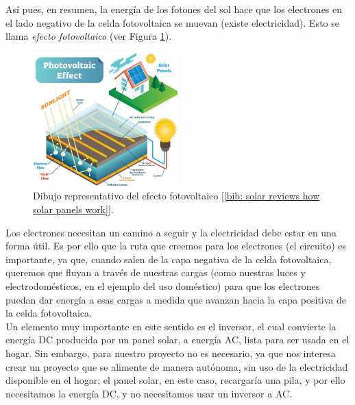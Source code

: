 \documentclass[12pt]{article}
\begin{document}
	\noindent Así pues, en resumen, la energía de los fotones del sol hace que los electrones en el lado negativo de la celda fotovoltaica se muevan (existe electricidad). Esto se llama \textit{efecto fotovoltaico} (ver Figura \ref{fig: efecto fotovoltaico}).\\
	
	\begin{figure}[h]
		\begin{center}
			\includegraphics[width=0.5\textwidth]{img/photovoltaic_effect.png}
			\caption{Dibujo representativo del efecto fotovoltaico [\ref{bib: solar reviews how solar panels work}].}
			\label{fig: efecto fotovoltaico}
		\end{center}
	\end{figure}
	
	\pagebreak
	
	\noindent Los electrones necesitan un camino a seguir y la electricidad debe estar en una forma útil. Es por ello que la ruta que creemos para los electrones (el circuito) es importante, ya que, cuando salen de la capa negativa de la celda fotovoltaica, queremos que fluyan a través de nuestras cargas (como nuestras luces y electrodomésticos, en el ejemplo del uso doméstico) para que los electrones puedan dar energía a esas cargas a medida que avanzan hacia la capa positiva de la celda fotovoltaica. \\
	
	
	\noindent Un elemento muy importante en este sentido es el inversor, el cual convierte la energía DC producida por un panel solar, a energía AC, lista para ser usada en el hogar. Sin embargo, para nuestro proyecto no es necesario, ya que nos interesa crear un proyecto que se alimente de manera autónoma, sin uso de la electricidad disponible en el hogar; el panel solar, en este caso, recargaría una pila, y por ello necesitamos la energía DC, y no necesitamos usar un inversor a AC. \\ 
	
\end{document}

